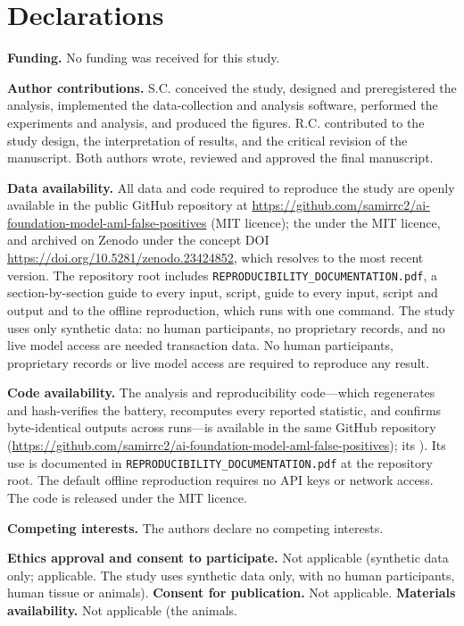 \documentclass[pdflatex,sn-basic,Numbered]{sn-jnl}
\newcommand{\HLtext}[1]{\texthl{#1}}
\newcommand{\HLdel}[1]{\textcolor{HLink}{\sout{#1}}}
\renewcommand{\HLtext}[1]{#1}\renewcommand{\HLdel}[1]{#1}%
\begin{document}
\section*{Declarations}

\textbf{Funding.} No funding was received for this study.

\textbf{Author contributions.} S.C. conceived the study, designed and preregistered the analysis, implemented the data-collection and analysis software, performed the experiments and analysis, and produced the figures. R.C. contributed to the study design, the interpretation of results, and the critical revision of the manuscript. Both authors wrote, reviewed and approved the final manuscript.

\textbf{Data availability.} All data and code required to reproduce the study are openly available in the public GitHub repository at \url{https://github.com/samirrc2/ai-foundation-model-aml-false-positives} \HLdel{(MIT licence); the} \HLtext{under the MIT licence, and archived on Zenodo under the concept DOI} \url{https://doi.org/10.5281/zenodo.23424852}\HLtext{, which resolves to the most recent version. The} repository root includes \texttt{REPRODUCIBILITY\_DOCUMENTATION.pdf}, a \HLdel{section-by-section guide to every input, script,} \HLtext{guide to every input, script} and output and to the \HLtext{offline reproduction, which runs with one command.} The study uses only synthetic \HLdel{data: no human participants, no proprietary records, and no live model access are needed} \HLtext{transaction data. No human participants, proprietary records or live model access are required} to reproduce any result.

\textbf{Code availability.} The analysis and reproducibility code---which regenerates and hash-verifies the battery, recomputes every reported statistic, and confirms byte-identical outputs across runs---is available in the same GitHub repository (\url{https://github.com/samirrc2/ai-foundation-model-aml-false-positives}\HLdel{); its} \HLtext{). Its} use is documented in \texttt{REPRODUCIBILITY\_DOCUMENTATION.pdf} at the repository root. The default offline reproduction requires no API keys or network access. The code is released under the MIT licence.

\textbf{Competing interests.} The authors declare no competing interests.

\textbf{Ethics approval and consent to participate.} Not \HLdel{applicable (synthetic data only;} \HLtext{applicable. The study uses synthetic data only, with} no human participants, human tissue or \HLdel{animals).} \HLdel{\textbf{Consent for publication.} Not applicable.} \HLdel{\textbf{Materials availability.} Not applicable (the} \HLtext{animals.}
\end{document}
